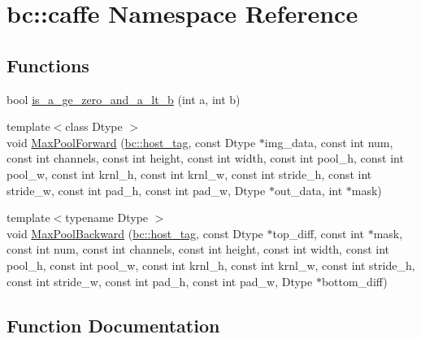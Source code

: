 \hypertarget{namespacebc_1_1caffe}{}\section{bc\+:\+:caffe Namespace Reference}
\label{namespacebc_1_1caffe}
\subsection*{Functions}
\begin{DoxyCompactItemize}
\item 
bool \hyperlink{namespacebc_1_1caffe_a1595969011d7a9a82c4a0fbafa04c452}{is\+\_\+a\+\_\+ge\+\_\+zero\+\_\+and\+\_\+a\+\_\+lt\+\_\+b} (int a, int b)
\item 
{\footnotesize template$<$class Dtype $>$ }\\void \hyperlink{namespacebc_1_1caffe_aba6971ea7a2796ad0ab683b9b63a9270}{Max\+Pool\+Forward} (\hyperlink{structbc_1_1host__tag}{bc\+::host\+\_\+tag}, const Dtype $\ast$img\+\_\+data, const int num, const int channels, const int height, const int width, const int pool\+\_\+h, const int pool\+\_\+w, const int krnl\+\_\+h, const int krnl\+\_\+w, const int stride\+\_\+h, const int stride\+\_\+w, const int pad\+\_\+h, const int pad\+\_\+w, Dtype $\ast$out\+\_\+data, int $\ast$mask)
\item 
{\footnotesize template$<$typename Dtype $>$ }\\void \hyperlink{namespacebc_1_1caffe_a58b8b5cb4f1834cbf79a204f50776890}{Max\+Pool\+Backward} (\hyperlink{structbc_1_1host__tag}{bc\+::host\+\_\+tag}, const Dtype $\ast$top\+\_\+diff, const int $\ast$mask, const int num, const int channels, const int height, const int width, const int pool\+\_\+h, const int pool\+\_\+w, const int krnl\+\_\+h, const int krnl\+\_\+w, const int stride\+\_\+h, const int stride\+\_\+w, const int pad\+\_\+h, const int pad\+\_\+w, Dtype $\ast$bottom\+\_\+diff)
\end{DoxyCompactItemize}


\subsection{Function Documentation}
\mbox{\label{namespacebc_1_1caffe_a1595969011d7a9a82c4a0fbafa04c452}} 
